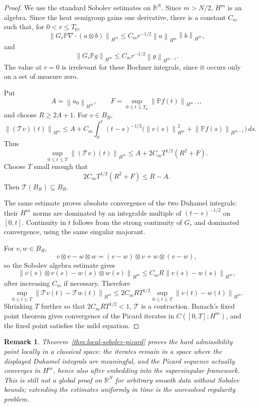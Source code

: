 \documentclass{amsart}
\newtheorem{rem}{Remark}
\newcommand{\norm}[1]{\left\lVert #1\right\rVert}
\begin{document}
\begin{proof}
We use the standard Sobolev estimates on $\mathbb{R}^N$.  Since
$m>N/2$, $H^m$ is an algebra.  Since the heat semigroup gains one derivative,
there is a constant $C_m$ such that, for $0<r\leq T_0$,
\[
  \norm{G_r\mathbb{P}\nabla\cdot(a\otimes b)}_{H^m}
  \leq C_m r^{-1/2}\norm{a}_{H^m}\norm{b}_{H^m},
\]
and
\[
  \norm{G_r\mathbb{P}g}_{H^m}
  \leq C_m r^{-1/2}\norm{g}_{H^{m-1}} .
\]
The value at $r=0$ is irrelevant for these Bochner integrals, since it occurs
only on a set of measure zero.

Put
\[
  A=\norm{u_0}_{H^m},\qquad
  F=\sup_{0\leq t\leq T_0}\norm{\mathbb{P}f(t)}_{H^{m-1}},
\]
and choose $R\geq 2A+1$.  For $v\in B_R$,
\[
  \norm{(\mathcal Tv)(t)}_{H^m}
  \leq
  A+C_m\int_0^t(t-s)^{-1/2}
  \bigl(\norm{v(s)}_{H^m}^2+\norm{\mathbb{P}f(s)}_{H^{m-1}}\bigr)\,ds .
\]
Thus
\[
  \sup_{0\leq t\leq T}\norm{(\mathcal Tv)(t)}_{H^m}
  \leq A+2C_mT^{1/2}(R^2+F).
\]
Choose $T$ small enough that
\[
  2C_mT^{1/2}(R^2+F)\leq R-A .
\]
Then $\mathcal T(B_R)\subseteq B_R$.

The same estimate proves absolute convergence of the two Duhamel integrals:
their $H^m$ norms are dominated by an integrable multiple of
$(t-s)^{-1/2}$ on $[0,t]$.  Continuity in $t$ follows from the strong
continuity of $G_r$ and dominated convergence, using the same singular
majorant.

For $v,w\in B_R$,
\[
  v\otimes v-w\otimes w=(v-w)\otimes v+w\otimes(v-w),
\]
so the Sobolev algebra estimate gives
\[
  \norm{v(s)\otimes v(s)-w(s)\otimes w(s)}_{H^m}
  \leq C_m R\norm{v(s)-w(s)}_{H^m},
\]
after increasing $C_m$ if necessary.  Therefore
\[
  \sup_{0\leq t\leq T}\norm{\mathcal Tv(t)-\mathcal Tw(t)}_{H^m}
  \leq
  2C_mRT^{1/2}
  \sup_{0\leq t\leq T}\norm{v(t)-w(t)}_{H^m}.
\]
Shrinking $T$ further so that $2C_mRT^{1/2}<1$, $\mathcal T$ is a contraction.
Banach's fixed point theorem gives convergence of the Picard iterates in
$C([0,T];H^m)$, and the fixed point satisfies the mild equation.
\end{proof}

\begin{rem}
Theorem~\ref{thm:local-sobolev-picard} proves the hard admissibility point
locally in a classical space: the iterates remain in a space where the
displayed Duhamel integrals are meaningful, and the Picard sequence actually
converges in $H^m$, hence also after embedding into the supersingular
framework.  This is still not a global proof on $\mathbb{R}^N$ for arbitrary
smooth data without Sobolev bounds; extending the estimates uniformly in time
is the unresolved regularity problem.
\end{rem}
\end{document}
